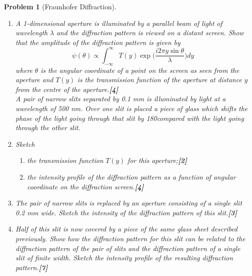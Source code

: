 \documentclass[a4paper]{article}
\theoremstyle{new}
\newtheorem{qns}{Problem}[subsection]
\begin{document}
\begin{qns}[Fraunhofer Diffraction]\leavevmode
\begin{enumerate}[label=(\roman*)]
\item A 1-dimensional aperture is illuminated by a parallel beam of light of wavelength $\lambda$ and the diffraction pattern is viewed on a distant screen. Show that the amplitude of the diffraction pattern is given by
$$\psi(\theta)\propto\int_{-\infty}^\infty T(y)\exp\bigg(\frac{i2\pi y\sin\theta}{\lambda}\bigg)dy$$
where $\theta$ is the angular coordinate of a point on the screen as seen from the aperture and $T(y)$ is the transmission function of the aperture at distance $y$ from the centre of the aperture.\hfill\textbf{[4]}\\[5pt]
A pair of narrow slits separated by 0.1 mm is illuminated by light at a wavelength of 500 nm. Over one slit is placed a piece of glass which shifts the phase of the light going through that slit by 180\degree compared with the light going through the other slit.
\item Sketch
\begin{enumerate}[label=(\alph*)]
    \item the transmission function $T(y)$ for this aperture;\hfill\textbf{[2]}
    \item the intensity profile of the diffraction pattern as a function of angular coordinate on the diffraction screen.\hfill\textbf{[4]}
\end{enumerate}
\item The pair of narrow slits is replaced by an aperture consisting of a single slit 0.2 mm wide. Sketch the intensity of the diffraction pattern of this slit.\hfill\textbf{[3]}
\item Half of this slit is now covered by a piece of the same glass sheet described previously. Show how the diffraction pattern for this slit can be related to the diffraction pattern of the pair of slits and the diffraction pattern of a single slit of finite width. Sketch the intensity profile of the resulting diffraction pattern.\hfill\textbf{[7]}
\end{enumerate}
\end{qns}
\end{document}
